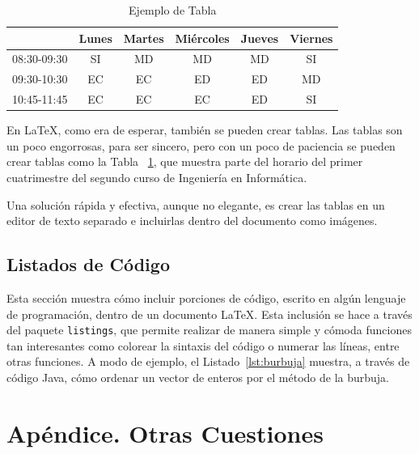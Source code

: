 \documentclass{article}
\begin{document}
\begin{table}[!b]
	\begin{center}
		\begin{tabular}{|l|c|c|c|c|c|}
		\hline
		             & Lunes & Martes & Miércoles & Jueves & Viernes \\ \hline
		 08:30-09:30 & SI    & MD     & MD        & MD     & SI \\ \hline
		 09:30-10:30 & EC    & EC     & ED        & ED     & MD \\ \hline
		 10:45-11:45 & EC    & EC     & EC        & ED     & SI \\ \hline	 	          
		\end{tabular}
		\caption{Ejemplo de Tabla}
		\label{tabla:ejemplo}
	\end{center}
\end{table}

En \LaTeX, como era de esperar, también se pueden crear tablas. Las tablas son un poco engorrosas, para ser sincero, pero con un poco de paciencia se pueden crear tablas como la Tabla ~\ref{tabla:ejemplo}, que muestra parte del horario del primer cuatrimestre del segundo curso de Ingeniería en Informática.

Una solución rápida y efectiva, aunque no elegante, es crear las tablas en un editor de texto separado e incluirlas dentro del documento como imágenes.

\subsection{Listados de Código}

Esta sección muestra cómo incluir porciones de código, escrito en algún lenguaje de programación, dentro de un documento \LaTeX. Esta inclusión se hace a través del paquete \texttt{listings}, que permite realizar de manera simple y cómoda funciones tan interesantes como colorear la sintaxis del código o numerar las líneas, entre otras funciones. A modo de ejemplo, el Listado~\ref{lst:burbuja} muestra, a través de código Java, cómo ordenar un vector de enteros por el método de la burbuja. 



\section*{Apéndice. Otras Cuestiones}
\end{document}
